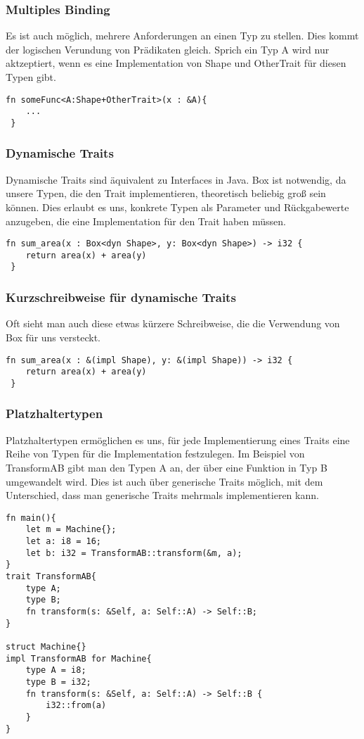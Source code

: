 \documentclass[a4paper, 1ppt]{article}
\begin{document}
\subsubsection{Multiples Binding}
Es ist auch möglich, mehrere Anforderungen an einen Typ zu stellen.
Dies kommt der logischen Verundung von Prädikaten gleich.
Sprich ein Typ A wird nur aktzeptiert, wenn es eine Implementation von Shape und OtherTrait für diesen Typen gibt.
\begin{verbatim}
fn someFunc<A:Shape+OtherTrait>(x : &A){
	...
 }
\end{verbatim}
\subsubsection{Dynamische Traits}
Dynamische Traits sind äquivalent zu Interfaces in Java.
Box ist notwendig, da unsere Typen, die den Trait implementieren, theoretisch beliebig groß sein können.
Dies erlaubt es uns, konkrete Typen als Parameter und Rückgabewerte anzugeben, die eine Implementation für den Trait haben müssen.
\begin{verbatim}
fn sum_area(x : Box<dyn Shape>, y: Box<dyn Shape>) -> i32 {
    return area(x) + area(y)
 }
\end{verbatim}
\subsubsection{Kurzschreibweise für dynamische Traits}
Oft sieht man auch diese etwas kürzere Schreibweise, die die Verwendung von Box für uns versteckt.
\begin{verbatim}
fn sum_area(x : &(impl Shape), y: &(impl Shape)) -> i32 {
    return area(x) + area(y)
 }
\end{verbatim}
\subsubsection{Platzhaltertypen}
Platzhaltertypen ermöglichen es uns, für jede Implementierung eines Traits eine Reihe von Typen für die Implementation festzulegen.
Im Beispiel von TransformAB gibt man den Typen A an, der über eine Funktion in Typ B umgewandelt wird. Dies ist auch über generische Traits möglich, mit dem Unterschied, dass man generische Traits mehrmals implementieren kann. 
\begin{verbatim}
fn main(){
    let m = Machine{};
    let a: i8 = 16;
    let b: i32 = TransformAB::transform(&m, a);
}
trait TransformAB{
    type A;
    type B;
    fn transform(s: &Self, a: Self::A) -> Self::B;
}

struct Machine{}
impl TransformAB for Machine{
    type A = i8;
    type B = i32;
    fn transform(s: &Self, a: Self::A) -> Self::B {
        i32::from(a)
    }
}
\end{verbatim}
\end{document}
